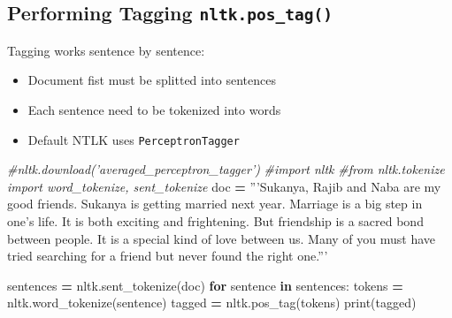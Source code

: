 \documentclass[
]{book}
\newenvironment{Shaded}{\begin{snugshade}}{\end{snugshade}}
\newcommand{\BuiltInTok}[1]{#1}
\newcommand{\CommentTok}[1]{\textcolor[rgb]{0.37,0.37,0.37}{\textit{#1}}}
\newcommand{\ControlFlowTok}[1]{\textcolor[rgb]{0.27,0.27,0.27}{\textbf{#1}}}
\newcommand{\KeywordTok}[1]{\textcolor[rgb]{0.27,0.27,0.27}{\textbf{#1}}}
\newcommand{\NormalTok}[1]{#1}
\newcommand{\OperatorTok}[1]{\textcolor[rgb]{0.43,0.43,0.43}{\textbf{#1}}}
\newcommand{\StringTok}[1]{\textcolor[rgb]{0.5,0.5,0.5}{#1}}
\providecommand{\tightlist}{%
  \setlength{\itemsep}{0pt}\setlength{\parskip}{0pt}}
\begin{document}
\hypertarget{performing-tagging-nltk.pos_tag}{%
\subsection{\texorpdfstring{Performing Tagging \texttt{nltk.pos\_tag()}}{Performing Tagging nltk.pos\_tag()}}\label{performing-tagging-nltk.pos_tag}}

Tagging works sentence by sentence:

\begin{itemize}
\tightlist
\item
  Document fist must be splitted into sentences\\
\item
  Each sentence need to be tokenized into words\\
\item
  Default NTLK uses \texttt{PerceptronTagger}
\end{itemize}

\begin{Shaded}
\begin{Highlighting}[]
\CommentTok{#nltk.download('averaged_perceptron_tagger')}
\CommentTok{#import nltk}
\CommentTok{#from nltk.tokenize import word_tokenize, sent_tokenize }
\NormalTok{doc }\OperatorTok{=} \StringTok{'''Sukanya, Rajib and Naba are my good friends. Sukanya is getting married next year. Marriage is a big step in one's life. It is both exciting and frightening. But friendship is a sacred bond between people. It is a special kind of love between us. Many of you must have tried searching for a friend but never found the right one.'''}

\NormalTok{sentences }\OperatorTok{=}\NormalTok{ nltk.sent_tokenize(doc)}
\ControlFlowTok{for}\NormalTok{ sentence }\KeywordTok{in}\NormalTok{ sentences:}
\NormalTok{  tokens }\OperatorTok{=}\NormalTok{ nltk.word_tokenize(sentence)}
\NormalTok{  tagged }\OperatorTok{=}\NormalTok{ nltk.pos_tag(tokens)}
  \BuiltInTok{print}\NormalTok{(tagged)}
\end{Highlighting}
\end{Shaded}
\end{document}
